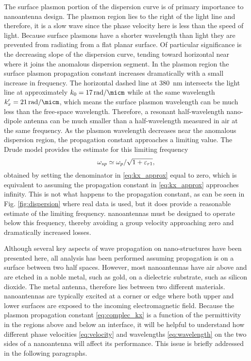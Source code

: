The surface plasmon portion of the dispersion curve is of primary importance to nanoantenna design. The plasmon region lies to the right of the light line and therefore, it is a slow wave since the phase velocity here is less than the speed of light. Because surface plasmons have a shorter wavelength than light they are prevented from radiating from a flat planar surface. Of particular significance is the decreasing slope of the dispersion curve, tending toward horizontal near where it joins the anomalous dispersion segment. In the plasmon region the surface plasmon propagation constant increases dramatically with a small increase in frequency. The horizontal dashed line at \SI{380}{\nm} intersects the light line at approximately $k_0 = \SI{17}{\radian \per \micm}$ while at the same wavelength $k_x' = \SI{21}{\radian \per \micm}$, which means the surface plasmon wavelength can be much less than the free-space wavelength. Therefore, a resonant half-wavelength nano-dipole antenna can be much smaller than a half-wavelength measured in air at the same frequency. As the plasmon wavelength decreases near the anomalous dispersion region, the propagation constant approaches a limiting value. The Drude model provides the estimate for this limiting frequency
%
\begin{equation}
  \omega_{sp} \simeq \omega_p/\sqrt{1 + \varepsilon_{r1}},
  \label{eq:apprx_plasma_freq}
\end{equation}
%
obtained by setting the denominator in \eqref{eq:kx_approx} equal to zero, which is equivalent to assuming the propagation constant in \eqref{eq:kx_approx} approaches infinity. This is not what happens to the propagation constant, as can be seen in Fig. \ref{fig:dispersion} where real data is used, but it does provide a reasonable estimate of the limiting frequency. nanoantennas must be designed to operate below this frequency, thereby avoiding a group velocity approaching zero and dramatically increased losses.

Although several key aspects of wave propagation on nano-structures have been presented here, all analysis has been performed assuming propagation is on a surface between two half spaces. However, most nanoantennas have air above and are etched in a noble metal, such as gold, on a dielectric substrate, such as silicon dioxide. The metal antenna, therefore lies between two different materials. nanoantennas are typically excited at a corner or edge where both upper and lower surfaces are exposed to the incoming electromagnetic field. Because the plasmon propagation constant \eqref{eq:complec_kx} is a function of the permittivity in the regions above and below an interface, it will be helpful to understand how different phase velocities \eqref{eq:velocity} and wavelengths \eqref{eq:wavelength} on the two sides of a nanoantenna will affect its performance. This issue is briefly addressed in the following paragraphs.
